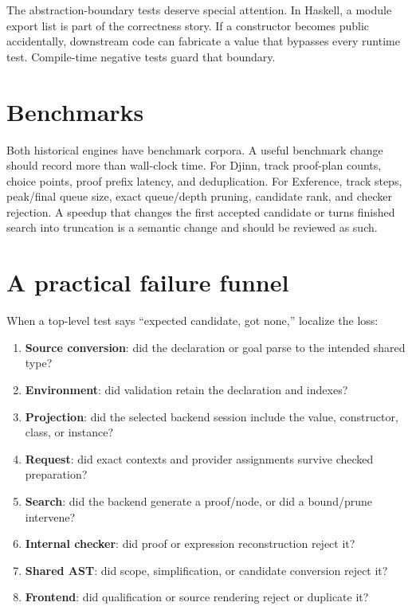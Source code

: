 \documentclass[10pt,letterpaper,oneside]{report}
\newcommand{\term}[1]{\textbf{#1}}
\begin{document}
The abstraction-boundary tests deserve special attention. In Haskell, a module export list is part of the correctness story. If a constructor becomes public accidentally, downstream code can fabricate a value that bypasses every runtime test. Compile-time negative tests guard that boundary.

\section{Benchmarks}

Both historical engines have benchmark corpora. A useful benchmark change should record more than wall-clock time. For Djinn, track proof-plan counts, choice points, proof prefix latency, and deduplication. For Exference, track steps, peak/final queue size, exact queue/depth pruning, candidate rank, and checker rejection. A speedup that changes the first accepted candidate or turns finished search into truncation is a semantic change and should be reviewed as such.

\section{A practical failure funnel}\label{sec:djex-failure-funnel}

When a top-level test says ``expected candidate, got none,'' localize the loss:

\begin{enumerate}
  \item \term{Source conversion}: did the declaration or goal parse to the intended shared type?
  \item \term{Environment}: did validation retain the declaration and indexes?
  \item \term{Projection}: did the selected backend session include the value, constructor, class, or instance?
  \item \term{Request}: did exact contexts and provider assignments survive checked preparation?
  \item \term{Search}: did the backend generate a proof/node, or did a bound/prune intervene?
  \item \term{Internal checker}: did proof or expression reconstruction reject it?
  \item \term{Shared AST}: did scope, simplification, or candidate conversion reject it?
  \item \term{Frontend}: did qualification or source rendering reject or duplicate it?
\end{enumerate}
\end{document}
